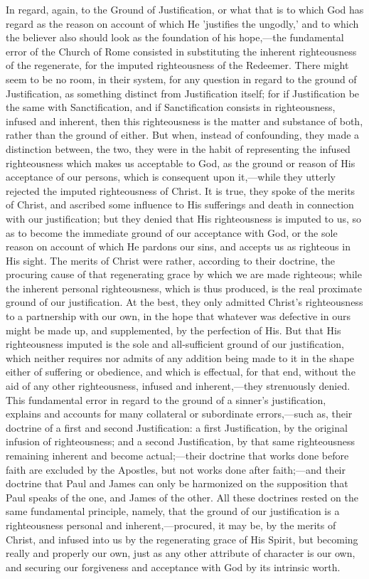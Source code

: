 \documentclass[
]{book}
\begin{document}
In regard, again, to the Ground of Justification, or what that is to which God has regard as the reason on account of which He 'justifies the ungodly,' and to which the believer also should look as the foundation of his hope,---the fundamental error of the Church of Rome consisted in substituting the inherent righteousness of the regenerate, for the imputed righteousness of the Redeemer. There might seem to be no room, in their system, for any question in regard to the ground of Justification, as something distinct from Justification itself; for if Justification be the same with Sanctification, and if Sanctification consists in righteousness, infused and inherent, then this righteousness is the matter and substance of both, rather than the ground of either. But when, instead of confounding, they made a distinction between, the two, they were in the habit of representing the infused righteousness which makes us acceptable to God, as the ground or reason of His acceptance of our persons, which is consequent upon it,---while they utterly rejected the imputed righteousness of Christ. It is true, they spoke of the merits of Christ, and ascribed some influence to His sufferings and death in connection with our justification; but they denied that His righteousness is imputed to us, so as to become the immediate ground of our acceptance with God, or the sole reason on account of which He pardons our sins, and accepts us as righteous in His sight. The merits of Christ were rather, according to their doctrine, the procuring cause of that regenerating grace by which we are made righteous; while the inherent personal righteousness, which is thus produced, is the real proximate ground of our justification. At the best, they only admitted Christ's righteousness to a partnership with our own, in the hope that whatever was defective in ours might be made up, and supplemented, by the perfection of His. But that His righteousness imputed is the sole and all-sufficient ground of our justification, which neither requires nor admits of any addition being made to it in the shape either of suffering or obedience, and which is effectual, for that end, without the aid of any other righteousness, infused and inherent,---they strenuously denied. This fundamental error in regard to the ground of a sinner's justification, explains and accounts for many collateral or subordinate errors,---such as, their doctrine of a first and second Justification: a first Justification, by the original infusion of righteousness; and a second Justification, by that same righteousness remaining inherent and become actual;---their doctrine that works done before faith are excluded by the Apostles, but not works done after faith;---and their doctrine that Paul and James can only be harmonized on the supposition that Paul speaks of the one, and James of the other. All these doctrines rested on the same fundamental principle, namely, that the ground of our justification is a righteousness personal and inherent,---procured, it may be, by the merits of Christ, and infused into us by the regenerating grace of His Spirit, but becoming really and properly our own, just as any other attribute of character is our own, and securing our forgiveness and acceptance with God by its intrinsic worth.
\end{document}
